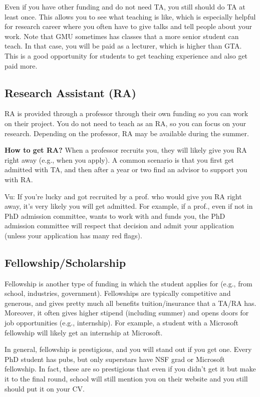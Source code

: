\documentclass[10pt]{article}
\begin{document}
Even if you have other funding and do not need TA, you still should do TA at least once.  This allows you to see what teaching is like, which is especially helpful for research career where you often have to give talks and tell people about your work. Note that GMU sometimes has classes that a more senior student can teach.  In that case, you will be paid as a lecturer, which is higher than GTA.  This is a good opportunity for students to get teaching experience and also get paid more.
\subsection{Research Assistant (RA)}
RA is provided through a professor through their own funding so you can work on their project.  
You do not need to teach as an RA, so you can focus on your research. Depending on the professor, RA may be available during the summer.

\textbf{How to get RA?} When a professor recruits you, they will likely give you RA right away (e.g., when you apply).  A common scenario is that you first get admitted with TA, and then after a year or two find an advisor to support you with RA. 


\begin{tcolorbox}[left=1pt,right=1pt,top=1pt,bottom=1pt]
Vu: If you're lucky and got recruited by a prof. who would give you RA right away, it's very likely you will get admitted.  For example, if a prof., even if not in PhD admission committee, wants to work with and funds you, the PhD admission committee will respect that decision and admit your application (unless your application has many red flags).
\end{tcolorbox}

\subsection{Fellowship/Scholarship}

Fellowship is another type of funding in which the student applies for (e.g., from school, industries, government). Fellowships are typically competitive and generous, and gives pretty much all benefits tuition/insurance that a TA/RA has.  Moreover, it often gives higher stipend (including summer) and opens doors for job opportunities (e.g., internship).  For example, a student with a Microsoft fellowship will likely get an internship at Microsoft.  

In general, fellowship is prestigious, and you will stand out if you get one.  Every PhD student has pubs, but only superstars have NSF grad or Microsoft fellowship. In fact, these are so prestigious that even if you didn't get it but make it to the final round, school will still mention you on their website and you still should put it on your CV.
\end{document}
